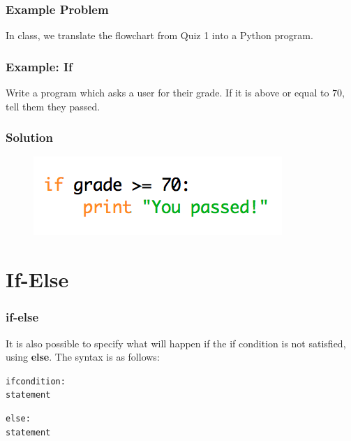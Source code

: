 \documentclass{beamer}
\begin{document}
\begin{frame}
\frametitle{Example Problem}

In class, we translate the flowchart from Quiz 1 into a Python program.
\end{frame}


\begin{frame}
\frametitle{Example: If}

Write a program which asks a user for their grade. If it is above or equal to $70$, tell them they passed.

\end{frame}


\begin{frame}
\frametitle{Solution}

\begin{figure}
\centering
\includegraphics[scale=0.8]{IMG/if_grade.png}
\end{figure}
\end{frame}








\section{If-Else}

\begin{frame}[fragile]
\frametitle{if-else}

It is also possible to specify what will happen if the if condition is not satisfied, using \textbf{else}. The syntax is as follows:
\begin{alltt}
if condition:
    statement
    
else:
    statement
\end{alltt}
\end{frame}
\end{document}
